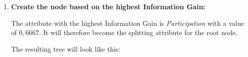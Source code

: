 \documentclass[
english,
smallborders
]{i6prcsht}
\begin{document}
\begin{solution}
\begin{enumerate}
\begin{enumerate}
\begin{enumerate}
\begin{alignat*}{3}
					                                                     & = 1 - 0,3333                                                                                                                                                                                                                                      \\
					                                                     & = 0,6667                                                                                                                                                                                                                                          \\
				                  \end{alignat*}
			            \end{enumerate}
			            
			      \item \textbf{Create the node based on the highest Information Gain:}
			            
			            The attribute with the highest Information Gain is \textit{Participation} with a value of $0,6667$. It will therefore become the splitting attribute for the root node.
			            
			            The resulting tree will look like this:
			            
			            \begin{center}	
\end{center}
\end{enumerate}
\end{enumerate}
\end{solution}
\end{document}
